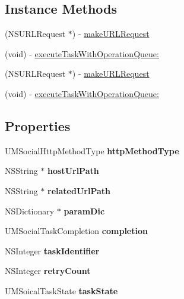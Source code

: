 \subsection*{Instance Methods}
\begin{DoxyCompactItemize}
\item 
(N\+S\+U\+R\+L\+Request $\ast$) -\/ \mbox{\hyperlink{interface_u_m_social_task_a632c408ac0132dedcf3428e65d4a0010}{make\+U\+R\+L\+Request}}
\item 
(void) -\/ \mbox{\hyperlink{interface_u_m_social_task_a79e5336ee23aa654eb48defea5450245}{execute\+Task\+With\+Operation\+Queue\+:}}
\item 
(N\+S\+U\+R\+L\+Request $\ast$) -\/ \mbox{\hyperlink{interface_u_m_social_task_a632c408ac0132dedcf3428e65d4a0010}{make\+U\+R\+L\+Request}}
\item 
(void) -\/ \mbox{\hyperlink{interface_u_m_social_task_a79e5336ee23aa654eb48defea5450245}{execute\+Task\+With\+Operation\+Queue\+:}}
\end{DoxyCompactItemize}
\subsection*{Properties}
\begin{DoxyCompactItemize}
\item 
\mbox{\label{interface_u_m_social_task_af9817fa4e994e10ea441415c9d1d5aba}} 
U\+M\+Social\+Http\+Method\+Type {\bfseries http\+Method\+Type}
\item 
\mbox{\label{interface_u_m_social_task_a0cb7efa997217cff2feb68745bd6e35e}} 
N\+S\+String $\ast$ {\bfseries host\+Url\+Path}
\item 
\mbox{\label{interface_u_m_social_task_ab1b9a1c0eba531058e59c0fbfb898c9b}} 
N\+S\+String $\ast$ {\bfseries related\+Url\+Path}
\item 
\mbox{\label{interface_u_m_social_task_a5830480db108025c858fb70ec90d6214}} 
N\+S\+Dictionary $\ast$ {\bfseries param\+Dic}
\item 
\mbox{\label{interface_u_m_social_task_a96ce7bc98619aa2d9fa1e444487e315b}} 
U\+M\+Social\+Task\+Completion {\bfseries completion}
\item 
\mbox{\label{interface_u_m_social_task_a5af3247df70695d78bb5e06fd3927132}} 
N\+S\+Integer {\bfseries task\+Identifier}
\item 
\mbox{\label{interface_u_m_social_task_a60f0ecdf49ab72950ba9b3e54619a9dc}} 
N\+S\+Integer {\bfseries retry\+Count}
\item 
\mbox{\label{interface_u_m_social_task_aa9050d5106746e20b22bfd36556bfb9d}} 
U\+M\+Soical\+Task\+State {\bfseries task\+State}
\end{DoxyCompactItemize}


